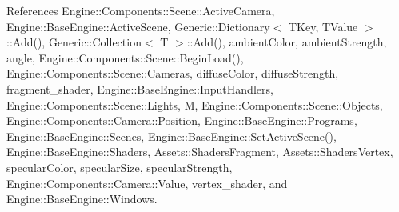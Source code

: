 References Engine\+::\+Components\+::\+Scene\+::\+Active\+Camera, Engine\+::\+Base\+Engine\+::\+Active\+Scene, Generic\+::\+Dictionary$<$ T\+Key, T\+Value $>$\+::\+Add(), Generic\+::\+Collection$<$ T $>$\+::\+Add(), ambient\+Color, ambient\+Strength, angle, Engine\+::\+Components\+::\+Scene\+::\+Begin\+Load(), Engine\+::\+Components\+::\+Scene\+::\+Cameras, diffuse\+Color, diffuse\+Strength, fragment\+\_\+shader, Engine\+::\+Base\+Engine\+::\+Input\+Handlers, Engine\+::\+Components\+::\+Scene\+::\+Lights, M, Engine\+::\+Components\+::\+Scene\+::\+Objects, Engine\+::\+Components\+::\+Camera\+::\+Position, Engine\+::\+Base\+Engine\+::\+Programs, Engine\+::\+Base\+Engine\+::\+Scenes, Engine\+::\+Base\+Engine\+::\+Set\+Active\+Scene(), Engine\+::\+Base\+Engine\+::\+Shaders, Assets\+::\+Shaders\+Fragment, Assets\+::\+Shaders\+Vertex, specular\+Color, specular\+Size, specular\+Strength, Engine\+::\+Components\+::\+Camera\+::\+Value, vertex\+\_\+shader, and Engine\+::\+Base\+Engine\+::\+Windows.


